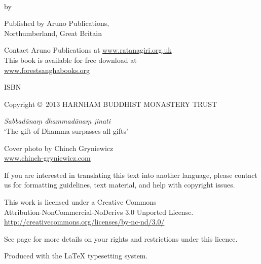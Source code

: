 {\copyrightsize\setlength{\parskip}{0.5\baselineskip}\setlength{\parindent}{0em}%
\raggedright%
\shaker\color[gray]{0.3}

\thetitle\\
by \theauthor

Published by Aruno Publications,\\
Northumberland, Great Britain

Contact Aruno Publications at \href{http://ratanagiri.org.uk/}{www.ratanagiri.org.uk}\\
This book is available for free download at\\
\href{http://forestsanghabooks.org/}{www.forestsanghabooks.org}

ISBN \theISBN

Copyright \copyright\ 2013 HARNHAM BUDDHIST MONASTERY TRUST

\textit{Sabbadānaṃ dhammadānaṃ jinati}\\
`The gift of Dhamma surpasses all gifts'

Cover photo by Chinch Gryniewicz\\
\href{http://chinch-gryniewicz.com}{www.chinch-gryniewicz.com}

{\tiny
If you are interested in translating this text into another language, please contact us for formatting guidelines, text material, and help with copyright issues.

This work is licensed under a Creative Commons\\
Attribution-NonCommercial-NoDerivs 3.0 Unported License.\\
\href{http://creativecommons.org/licenses/by-nc-nd/3.0/}{http://creativecommons.org/licenses/by-nc-nd/3.0/}

See page \pageref{copyright-details} for more details on your rights and restrictions under this licence.

Produced with the {\selectfont\LaTeX} typesetting system.

\theEditionInfo

}}

